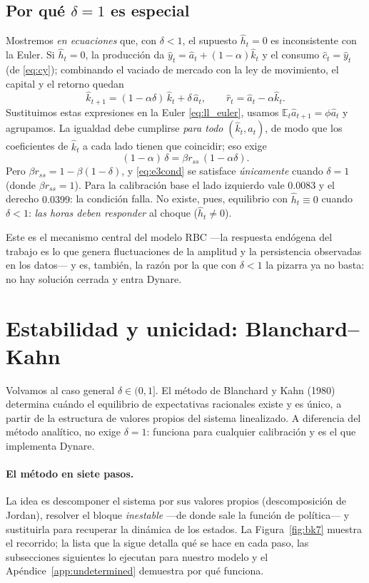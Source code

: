 \documentclass[11pt,a4paper]{report}
\newcommand{\E}{\mathbb{E}}
\begin{document}
\subsection{Por qué $\delta=1$ es especial}

Mostremos \emph{en ecuaciones} que, con $\delta<1$, el supuesto $\hat{h}_t=0$ es
inconsistente con la Euler. Si $\hat{h}_t=0$, la producción da
$\hat{y}_t=\hat{a}_t+(1-\alpha)\hat{k}_t$ y el consumo $\hat{c}_t=\hat{y}_t$ (de
\eqref{eq:cy}); combinando el vaciado de mercado con la ley de movimiento, el
capital y el retorno quedan
\[
\hat{k}_{t+1}=(1-\alpha\delta)\,\hat{k}_t+\delta\,\hat{a}_t,
\qquad
\hat{r}_t=\hat{a}_t-\alpha\hat{k}_t.
\]
Sustituimos estas expresiones en la Euler \eqref{eq:ll_euler}, usamos
$\E_t\hat{a}_{t+1}=\phi\hat{a}_t$ y agrupamos. La igualdad debe cumplirse
\emph{para todo} $(\hat{k}_t,\hat{a}_t)$, de modo que los coeficientes de
$\hat{k}_t$ a cada lado tienen que coincidir; eso exige
\begin{equation}
(1-\alpha)\,\delta=\beta r_{ss}\,(1-\alpha\delta). \label{eq:e3cond}
\end{equation}
Pero $\beta r_{ss}=1-\beta(1-\delta)$, y \eqref{eq:e3cond} se satisface
\emph{únicamente} cuando $\delta=1$ (donde $\beta r_{ss}=1$). Para la calibración
base el lado izquierdo vale $0.0083$ y el derecho $0.0399$: la condición falla.
No existe, pues, equilibrio con $\hat{h}_t\equiv0$ cuando $\delta<1$: \emph{las
horas deben responder} al choque ($\hat{h}_t\neq0$).

Este es el mecanismo central del modelo RBC ---la respuesta endógena del trabajo
es lo que genera fluctuaciones de la amplitud y la persistencia observadas en
los datos--- y es, también, la razón por la que con $\delta<1$ la pizarra ya no
basta: no hay solución cerrada y entra Dynare.

\section{Estabilidad y unicidad: Blanchard--Kahn}
\label{sec:bk}

Volvamos al caso general $\delta\in(0,1]$. El método de Blanchard y Kahn (1980)
determina cuándo el equilibrio de expectativas racionales existe y es único, a
partir de la estructura de valores propios del sistema linealizado. A diferencia del
método analítico, no exige $\delta=1$: funciona para cualquier calibración y es el que
implementa Dynare.

\paragraph{El método en siete pasos.} La idea es descomponer el sistema por sus
valores propios (descomposición de Jordan), resolver el bloque \emph{inestable} ---de
donde sale la función de política--- y sustituirla para recuperar la dinámica de los
estados. La Figura~\ref{fig:bk7} muestra el recorrido; la lista que la sigue detalla
qué se hace en cada paso, las subsecciones siguientes lo ejecutan para nuestro modelo y
el Apéndice~\ref{app:undetermined} demuestra por qué funciona.
\end{document}

